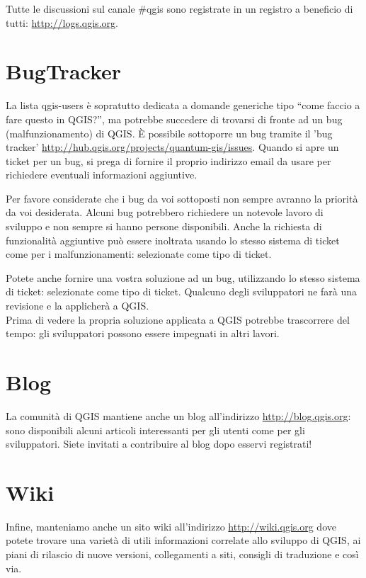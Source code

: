 Tutte le discussioni sul canale \#qgis sono registrate in un registro a beneficio
di tutti: \url{http://logs.qgis.org}.

\section{BugTracker}
La lista qgis-users è sopratutto dedicata a domande generiche tipo ``come faccio a
fare questo in QGIS?'', ma potrebbe succedere di trovarsi di fronte ad un bug (malfunzionamento) di QGIS. 
È possibile sottoporre un bug tramite il 'bug tracker' \url{http://hub.qgis.org/projects/quantum-gis/issues}. 
Quando si apre un ticket per un bug, si prega di fornire il proprio indirizzo email da usare
per richiedere eventuali informazioni aggiuntive.

Per favore considerate che i bug da voi sottoposti non sempre avranno la priorità
da voi desiderata. Alcuni bug potrebbero richiedere un notevole lavoro di sviluppo
e non sempre si hanno persone disponibili.
Anche la richiesta di funzionalità aggiuntive può essere inoltrata usando lo stesso sistema di ticket come per 
i malfunzionamenti: selezionate  come tipo di ticket.

Potete anche fornire una vostra soluzione ad un bug, utilizzando lo stesso sistema di ticket: selezionate 
 come tipo di ticket. Qualcuno degli sviluppatori ne farà una revisione e la 
applicherà a QGIS. \\

Prima di vedere la propria soluzione applicata a QGIS potrebbe trascorrere del tempo: gli sviluppatori 
possono essere impegnati in altri lavori.


\section{Blog}
La comunità di QGIS mantiene anche un blog all'indirizzo \url{http://blog.qgis.org}: sono disponibili 
alcuni articoli interessanti per gli utenti come per gli sviluppatori. 
Siete invitati a contribuire al blog dopo esservi registrati!

\section{Wiki}
Infine, manteniamo anche un sito wiki all'indirizzo \url{http://wiki.qgis.org} dove potete trovare una varietà 
di utili informazioni correlate allo sviluppo di QGIS, ai piani di rilascio di nuove versioni, collegamenti a 
siti, consigli di traduzione e così via. 
